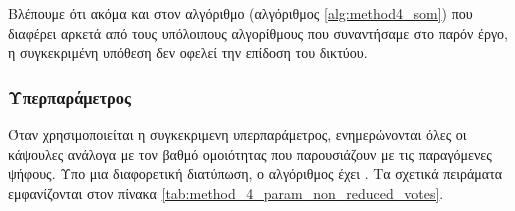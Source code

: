 \begin{table}[h]
    \begin{center}
    \end{center}
    \caption[]{\label{tab:method_4_param_non_reduced_votes}Επίδραση της παραμέτρου  της μεθόδου 4 στην επίδοση στο σύνολο δεδομένων ελέγχου . Τα πειράματα αυτά πραγματοποιήθηκαν για 10 εποχές με μέγεθος δέσμης ίσο με 8.} 
\end{table}

Βλέπουμε ότι ακόμα και στον αλγόριθμο  (αλγόριθμος \ref{alg:method4_som}) που διαφέρει αρκετά από τους υπόλοιπους αλγορίθμους που συναντήσαμε στο παρόν έργο, η συγκεκριμένη υπόθεση δεν οφελεί την επίδοση του δικτύου.

\subsubsection{Υπερπαράμετρος }
Όταν χρησιμοποιείται η συγκεκριμενη υπερπαράμετρος, ενημερώνονται όλες οι κάψουλες ανάλογα με τον βαθμό ομοιότητας που παρουσιάζουν με τις παραγόμενες ψήφους. Υπο μια διαφορετική διατύπωση, ο αλγόριθμος  έχει . Τα σχετικά πειράματα εμφανίζονται στον πίνακα \ref{tab:method_4_param_non_reduced_votes}.


\begin{table}[h]
    \begin{center}
    \end{center}
    \caption[]{\label{tab:method_4_param_non_reduced_votes}Πειράματα για την παράμετρο  της μεθόδου 4 στο σύνολο δεδομένων ελέγχου . Τα πειράματα πραγματοποιήθηκαν για 10 εποχές με μέγεθος δέσμης ίσο με 8.} 
\end{table}


